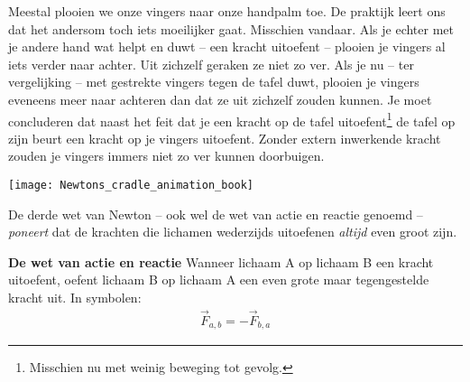 \documentclass{ximera}
\begin{document}
	\author{Bart Lambregs}
    \xmsource\xmuitleg


	Meestal plooien we onze vingers naar onze handpalm toe. De praktijk leert ons dat het andersom toch iets moeilijker gaat. Misschien vandaar. Als je echter met je andere hand wat helpt en duwt -- een kracht uitoefent -- plooien je vingers al iets verder naar achter. Uit zichzelf geraken ze niet zo ver. Als je nu -- ter vergelijking -- met gestrekte vingers tegen de tafel duwt, plooien je vingers eveneens meer naar achteren dan dat ze uit zichzelf zouden kunnen. Je moet concluderen dat naast het feit dat je een kracht op de tafel uitoefent\footnote{Misschien nu met weinig beweging tot gevolg.} de tafel op zijn beurt een kracht op je vingers uitoefent. Zonder extern inwerkende kracht zouden je vingers immers niet zo ver kunnen doorbuigen.

	\begin{image}
	\texttt{[image: Newtons\_cradle\_animation\_book]}
	\end{image}
	
	De derde wet van Newton -- ook wel de wet van actie en reactie genoemd -- \textit{poneert} dat de krachten die lichamen wederzijds uitoefenen \textit{altijd} even groot zijn.
	\begin{definition}
	{\textbf{De wet van actie en reactie}}
	Wanneer lichaam A op lichaam B een kracht uitoefent, oefent lichaam B op lichaam A een even grote maar tegengestelde kracht uit. In symbolen:
	\begin{eqnarray*}
	\vec{F}_{a,b}=-\vec{F}_{b,a}
	\end{eqnarray*}
	\end{definition}
\end{document}
